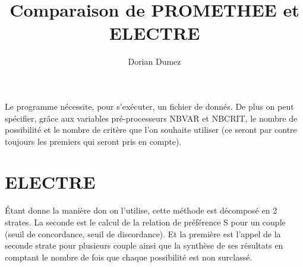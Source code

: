 \documentclass[12pt,a4paper]{article}
\title{Comparaison de PROMETHEE et ELECTRE}
\author{Dorian Dumez}
\begin{document}
\maketitle

Le programme nécessite, pour s'exécuter, un fichier de donnés. De plus on peut spécifier, grâce aux variables pré-processeurs NBVAR et NBCRIT, le nombre de possibilité et le nombre de critère que l'on souhaite utiliser (ce seront par contre toujours les premiers qui seront pris en compte).\\

\section{ELECTRE}

Étant donne la manière don on l'utilise, cette méthode est décomposé en 2 strates. La seconde est le calcul de la relation de préférence S pour un couple (seuil de concordance, seuil de discordance). Et la première est l'appel de la seconde strate pour plusieurs couple ainsi que la synthèse de ses résultats en comptant le nombre de fois que chaque possibilité est non surclassé.\\
\end{document}

